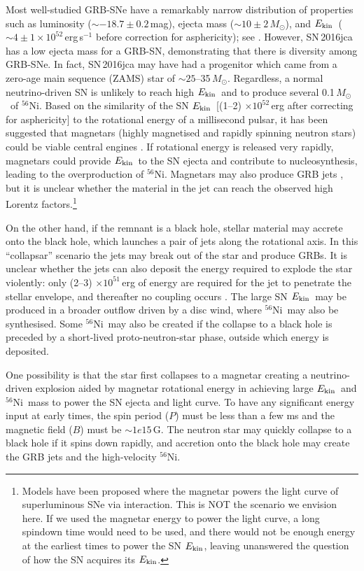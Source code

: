 \documentclass[fleqn,usenatbib]{mnras}
\newcommand{\Msun}{$M_{\odot}$}
\newcommand{\Nifs}{$^{56}$Ni}
\newcommand{\KE}{$E_{\rm kin}$}
\begin{document}
Most well-studied GRB-SNe have a remarkably narrow distribution of properties such as
luminosity ($\sim -18.7 \pm 0.2$\,mag), ejecta mass ($\sim 10\pm 2$\,\Msun), and 
\KE\  ($\sim 4 \pm 1 \times 10^{52}$\,erg\,s$^{-1}$ before correction for
asphericity); see \citet{Mazzali17}. 
However, SN\,2016jca has a low ejecta mass for a GRB-SN, demonstrating that there is diversity among GRB-SNe.
In fact, SN\,2016jca may have had a progenitor which came from a zero-age main sequence (ZAMS) star of $\sim 25$--35\,\Msun. 
Regardless, a normal neutrino-driven SN is unlikely to reach high \KE\ and to 
produce several 0.1\,\Msun\ of \Nifs.
Based on the similarity of the SN \KE\  [(1--2) $\times 10^{52}$\,erg after 
correcting for asphericity] to the rotational energy of a millisecond pulsar, it 
has been suggested that magnetars (highly magnetised and rapidly spinning neutron 
stars) could be viable central engines \citep{Mazzali06,Metzger2011,Mazzali14}.  
If rotational energy is released very rapidly, magnetars could provide \KE\ to 
the SN ejecta and contribute to nucleosynthesis, leading to the overproduction of 
\Nifs. Magnetars may also produce GRB jets \citep{Uzdensky07}, but it is unclear 
whether the material in the jet can reach the observed high Lorentz factors.\footnote{Models have been proposed where the magnetar powers the light
curve of superluminous SNe via interaction. This is NOT the scenario we envision here. If we
used the magnetar energy to power the light curve, a long spindown time would need
to be used, and there would not be enough energy at the earliest times to power 
the SN \KE, leaving unanswered the question of how the SN acquires its \KE.}

On the other hand, if the remnant is a black hole, stellar material may accrete 
onto the black hole, which launches a pair of jets along the rotational axis.  
In this ``collapsar'' scenario the jets may break out of the star and produce  
GRBs. It is unclear whether the jets can also deposit the energy required to 
explode the star violently: only (2--3) $\times 10^{51}$\,erg of energy are required 
for the jet to penetrate the stellar envelope, and thereafter no coupling occurs 
\citep{Lazzati13}. The large SN \KE\ may be produced in a broader outflow driven
by a disc wind, where \Nifs\ may also be synthesised. Some \Nifs\ may also be
created if the collapse to a black hole is preceded by a short-lived 
proto-neutron-star phase, outside which energy is deposited.  

One possibility is that the star first collapses to a magnetar creating a
neutrino-driven explosion aided by magnetar rotational energy in achieving large
\KE\ and \Nifs\ mass to power the SN ejecta and light curve. To have any
significant energy input at early times, the spin period ($P$) must be less 
than a few ms and the magnetic field ($B$) must be $\sim 1e15$\,G. 
The neutron star may quickly collapse to a black hole if it spins down
rapidly, and accretion onto the black hole may create the GRB jets and the
high-velocity \Nifs.
\end{document}
